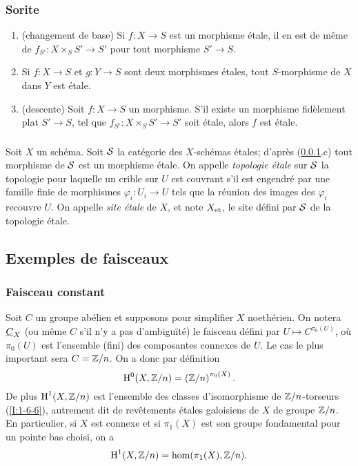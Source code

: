 \documentclass[oneside]{book}
\begin{document}
\subsubsection{Sorite}\label{I:2-1-3}
\begin{enumerate}[\indent a)]
  \item (changement de base) Si $f:X\to S$ est un morphisme étale, il en est 
    de même de $f_{S'}:X\times_S S'\to S'$ pour tout morphisme $S'\to S$. 
  \item Si $f:X\to S$ et $g:Y\to S$ sont deux morphismes étales, tout 
    $S$-morphisme de $X$ dans $Y$ est étale.
  \item (descente) Soit $f:X\to S$ un morphisme. S'il existe un morphisme 
    fidèlement plat $S'\to S$, tel que $f_{S'}:X\times_S S'\to S'$ soit 
    étale, alors $f$ est étale.
\end{enumerate}





\subsubsection{}\label{I:2-1-4}

Soit $X$ un schéma. Soit $\mathcal{S}$ la catégorie des $X$-schémas étales; 
d'après (\ref{I:2-1-3}.c) tout morphisme de $\mathcal{S}$ est un morphisme étale. 
On appelle \emph{topologie étale} sur $\mathcal{S}$ la topologie pour laquelle un 
crible sur $U$ est couvrant s'il est engendré par une famille finie de 
morphismes $\varphi_i:U_i\to U$ tels que la réunion des images des 
$\varphi_i$ recouvre $U$. On appelle \emph{site étale} de $X$, et note 
${X}_{\textnormal{et}}$, le site défini par $\mathcal{S}$ de la topologie étale. 










\subsection{Exemples de faisceaux}\label{I:2-2}





\subsubsection{Faisceau constant}\label{I:2-2-1}

Soit $C$ un groupe abélien et supposons pour simplifier $X$ noethérien. On 
notera $\underline{C}_X$ (ou même $C$ s'il n'y a pas d'ambiguïté) le faisceau 
défini par $U\mapsto C^{\pi_0(U)}$, où $\pi_0(U)$ est l'ensemble (fini) des 
composantes connexes de $U$. Le cas le plus important sera $C=\mathbb{Z}/n$. On a donc 
par définition 
\[
  \operatorname{H}^0(X,\mathbb{Z}/n)=\left(\mathbb{Z}/n\right)^{\pi_0(X)}\text{.}
\]
De plus $\operatorname{H}^1(X,\mathbb{Z}/n)$ est l'ensemble des classes d'isomorphisme de 
$\mathbb{Z}/n$-torseurs (\ref{I:1-6-6}), autrement dit de revêtements étales 
galoisiens de $X$ de groupe $\mathbb{Z}/n$. En particulier, si $X$ est connexe et si 
$\pi_1(X)$ est son groupe fondamental pour un pointe bas choisi, on a 
\[
  \operatorname{H}^1(X,\mathbb{Z}/n) = \hom(\pi_1(X),\mathbb{Z}/n)\text{.}
\]
\end{document}
